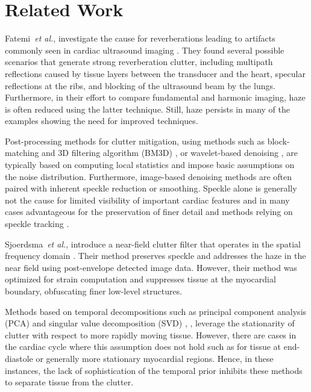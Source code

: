 \documentclass[journal,twoside,web]{ieeecolor}
\begin{document}
\section{Related Work}

Fatemi~\emph{et al.}, investigate the cause for reverberations leading to artifacts commonly seen in cardiac ultrasound imaging \cite{fatemiStudyingOriginReverberation2019}. They found several possible scenarios that generate strong reverberation clutter, including multipath reflections caused by tissue layers between the transducer and the heart, specular reflections at the ribs, and blocking of the ultrasound beam by the lungs. Furthermore, in their effort to compare fundamental and harmonic imaging, haze is often reduced using the latter technique. Still, haze persists in many of the examples showing the need for improved techniques. 

Post-processing methods for clutter mitigation, using methods such as block-matching and 3D filtering algorithm (BM3D) \cite{dabovImageDenoisingBlockmatching2006}, \cite{santosUltrasoundImageDespeckling2017} or wavelet-based denoising \cite{yueNonlinearMultiscaleWavelet2006}, are typically based on computing local statistics and impose basic assumptions on the noise distribution. Furthermore, image-based denoising methods are often paired with inherent speckle reduction or smoothing. Speckle alone is generally not the cause for limited visibility of important cardiac features and in many cases advantageous for the preservation of finer detail and methods relying on speckle tracking \cite{geyerAssessmentMyocardialMechanics2010}. 

Sjoerdsma~\emph{et al.}, introduce a near-field clutter filter that operates in the spatial frequency domain \cite{sjoerdsmaSpatialNearFieldClutter2021}. Their method preserves speckle and addresses the haze in the near field using post-envelope detected image data. However, their method was optimized for strain computation and suppresses tissue at the myocardial boundary, obfuscating finer low-level structures.

Methods based on temporal decompositions such as principal component analysis (PCA) and singular value decomposition (SVD)  \cite{turekClutterMitigationEchocardiography2015}, \cite{solomonDeepUnfoldedRobust2020}, \cite{wildeboerBlindSourceSeparation2020} leverage the stationarity of clutter with respect to more rapidly moving tissue. However, there are cases in the cardiac cycle where this assumption does not hold such as for tissue at end-diastole or generally more stationary myocardial regions. Hence, in these instances, the lack of sophistication of the temporal prior inhibits these methods to separate tissue from the clutter.
\end{document}
